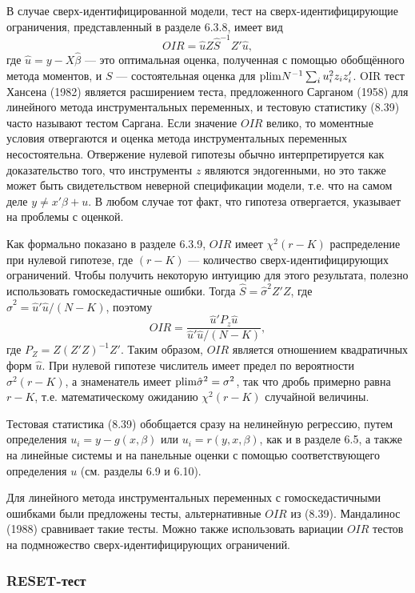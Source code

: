 В случае сверх-идентифицированной модели, тест на сверх-идентифицирующие  ограничения, представленный в разделе 6.3.8, имеет вид
\begin{equation}
OIR = \hat{u}Z\hat{S}^{-1}Z'\hat{u},
\end{equation}
где $\hat{u} = y - X\hat{\beta}$ --- это оптимальная оценка, полученная с помощью обобщённого метода моментов, и $S$ --- состоятельная оценка для $\mathrm{plim } N^{-1}\sum_i u_i^2z_iz_i'$. OIR тест Хансена (1982) является расширением теста, предложенного Сарганом (1958) для линейного метода инструментальных переменных, и тестовую статистику (8.39) часто называют тестом Саргана. Если значение $OIR$ велико, то моментные условия отвергаются и оценка метода инструментальных переменных несостоятельна. Отвержение нулевой гипотезы обычно интерпретируется как доказательство того, что инструменты $z$ являются эндогенными, но это также может быть свидетельством неверной спецификации модели, т.е. что на самом деле $y \not= x'\beta + u$. В любом случае тот факт, что гипотеза отвергается, указывает на проблемы с оценкой.

Как формально показано в разделе 6.3.9, $OIR$ имеет $\chi^2(r - K)$ распределение при нулевой гипотезе, где $(r - K)$ --- количество сверх-идентифицирующих ограничений. Чтобы получить некоторую интуицию для этого результата, полезно использовать гомоскедастичные ошибки. Тогда $\hat{S} = \hat{\sigma}^2Z'Z$, где $\hat{\sigma}^2 = \hat{u}'\hat{u}/(N - K)$, поэтому
\[
OIR = \frac{\hat{u}'P_z\hat{u}}{\hat{u}'\hat{u}/(N - K)},
\]
где $P_Z = Z(Z'Z)^{-1}Z'$. Таким образом, $OIR$ является отношением квадратичных форм $\hat{u}$. При нулевой гипотезе числитель имеет предел по вероятности $\sigma^2(r - K)$, а знаменатель имеет $\mathrm{plim }\hat{\sigma}^2 = \sigma^2$, так что дробь примерно равна $r - K$, т.е. математическому ожиданию $\chi^2(r - K)$ случайной величины.

Тестовая статистика (8.39) обобщается сразу на нелинейную регрессию, путем определения $u_i = y - g(x, \beta)$ или $u_i = r(y,x,\beta)$, как и в разделе 6.5, а также на линейные системы и на панельные оценки с помощью соответствующего определения $u$ (см. разделы 6.9 и 6.10).

Для линейного метода инструментальных переменных с гомоскедастичными ошибками были предложены тесты, альтернативные $OIR$ из (8.39). Мандалинос (1988) сравнивает такие тесты. Можно также использовать вариации $OIR$ тестов на подмножество сверх-идентифицирующих ограничений.

\subsubsection{RESET-тест}

